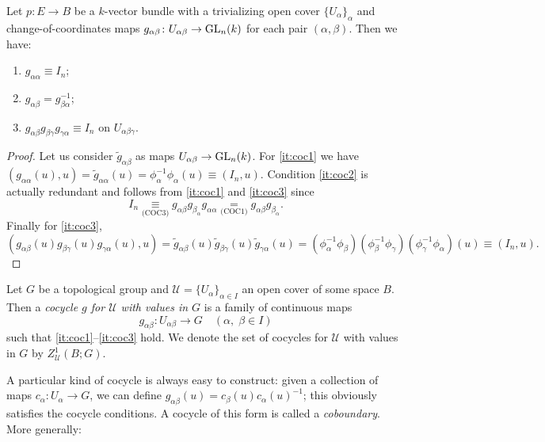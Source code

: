 \documentclass[a4paper,openany]{scrbook}
\begin{document}
\begin{lemma} \label{lemma:vectorbundlegivescocycle}
Let $p\colon E \to B$ be a $k$-vector bundle with a trivializing open cover $\{U_\alpha\}_\alpha$ and change-of-coordinates maps $g_{\alpha\beta}\colon U_{\alpha\beta} \to \operatorname{GL}_{n}(k)$ for each pair $(\alpha,\beta)$. Then we have:
\begin{enumerate}[label=\normalfont \bfseries{(COC\arabic*)},leftmargin=*]
\item $g_{\alpha\alpha} \equiv I_n$; \label{it:coc1}
\item $g_{\alpha\beta} = g_{\beta\alpha}^{-1}$; \label{it:coc2}
\item $g_{\alpha\beta} g_{\beta\gamma} g_{\gamma\alpha} \equiv I_n$ on $U_{\alpha\beta\gamma}$. \label{it:coc3}
\end{enumerate}
\end{lemma}

\begin{proof}
  Let us consider $\tilde g_{\alpha\beta}$ as maps $U_{\alpha\beta} \to \operatorname{GL}_n(k)$. For \ref{it:coc1} we have $(g_{\alpha\alpha}(u),u) = \tilde g_{\alpha\alpha}(u) =  \phi_\alpha^{-1} \phi_\alpha(u) \equiv (I_n,u)$.
Condition \ref{it:coc2} is actually redundant and follows from \ref{it:coc1} and \ref{it:coc3} since
\[
I_n \underset{\text{(COC3)}}\equiv g_{\alpha\beta} g_{\beta_\alpha} g_{\alpha\alpha} \underset{\text{(COC1)}} = g_{\alpha\beta} g_{\beta_\alpha}.
\]
 Finally for \ref{it:coc3},
\[
  (g_{\alpha\beta}(u) g_{\beta \gamma}(u) g_{\gamma\alpha}(u),u) = \tilde g_{\alpha\beta}(u) \tilde g_{\beta \gamma}(u) \tilde g_{\gamma\alpha}(u) = (\phi_\alpha^{-1} \phi_\beta)(\phi_\beta^{-1}\phi_\gamma)(\phi_\gamma^{-1}\phi_\alpha)(u) \equiv (I_n,u).
\]
\end{proof}


\begin{defn}
Let $G$ be a topological group and $\mathcal U = \{U_\alpha\}_{\alpha \in I}$ an open cover of some space $B$. Then a \emph{cocycle $g$ for $\mathcal U$ with values in $G$} is a family of continuous maps
\[
g_{\alpha\beta}\colon U_{\alpha\beta} \to G \quad (\alpha,\;\beta \in I)
\]
such that \ref{it:coc1}--\ref{it:coc3} hold. We denote the set of cocycles for $\mathcal U$ with values in $G$ by $Z^1_{\mathcal U}(B;G)$.
\end{defn}


A particular kind of cocycle is always easy to construct: given a collection of maps $c_\alpha\colon U_\alpha \to G$, we can define $g_{\alpha\beta}(u) = c_\beta(u)c_\alpha(u)^{-1}$; this obviously satisfies the cocycle conditions. A cocycle of this form is called a \emph{coboundary}. More generally:
\end{document}
